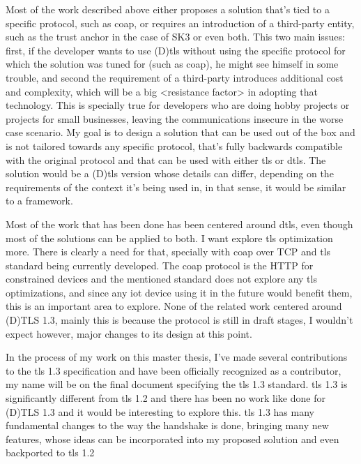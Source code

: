 \documentclass{llncs}
\begin{document}
Most of the work described above either proposes a solution that's tied to a
specific protocol, such as \gls{coap}, or requires an introduction of a third-party
entity, such as the trust anchor in the case of SK3\cite{S3KScala62:online} or
even both. This two main issues: first, if the developer wants to use (D)\gls{tls}
without using the specific protocol for which the solution was tuned for (such as \gls{coap}),
he might see himself in some trouble, and second the requirement of a third-party
introduces additional cost and complexity, which will be a big <resistance factor>
in adopting that technology. This is specially true for developers who are doing
hobby projects or projects for small businesses, leaving the communications insecure
in the worse case scenario. My goal is to design a solution that can be used out
of the box and is not tailored towards any specific protocol, that's fully backwards
compatible with the original protocol and that can be used with either \gls{tls}
or \gls{dtls}. The solution would be a (D)\gls{tls} version whose details can differ,
depending on the requirements of the context it's being used in, in that sense,
it would be similar to a framework.

Most of the work that has been done has been centered around \gls{dtls},
even though most of the solutions can be applied to both.
I want explore \gls{tls} optimization more. There is clearly a need for that, specially with \gls{coap} over
TCP and \gls{tls} standard being currently developed. The \gls{coap} protocol is the HTTP
for constrained devices and the mentioned standard does not explore any \gls{tls}
optimizations, and since any \gls{iot} device using it in the future would benefit
them, this is an important area to explore. None of the related work centered around
(D)TLS 1.3, mainly this is because the protocol is still in draft stages, I wouldn't expect
however, major changes to its design at this point.

In the process of my work on this master thesis, I've made several
contributions to the \gls{tls} 1.3 specification and have been officially
recognized as a contributor, my name will be on the final document specifying
the \gls{tls} 1.3 standard. \gls{tls} 1.3 is significantly different from \gls{tls} 1.2
and there has been no work like \cite{rfc7925} done for (D)TLS 1.3
and it would be interesting to explore this. \gls{tls} 1.3 has many fundamental changes
to the way the handshake is done, bringing many new features, whose ideas can
be incorporated into my proposed solution and even backported to \gls{tls} 1.2
\end{document}
